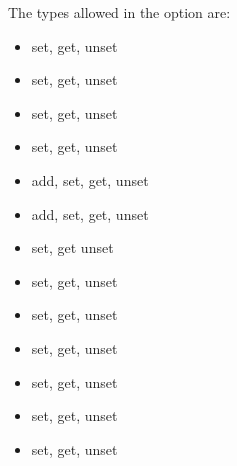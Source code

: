 The types allowed in the option  are:
\begin{itemize}
\item {} set, get, unset
\item {} set, get, unset
\item {} set, get, unset
\item {} set, get, unset
\item {} add, set, get, unset
\item {} add, set, get, unset
\item {} set, get unset
\item {} set, get, unset
\item {} set, get, unset
\item {} set, get, unset
\item {} set, get, unset
\item {} set, get, unset
\item {} set, get, unset
\end{itemize}


